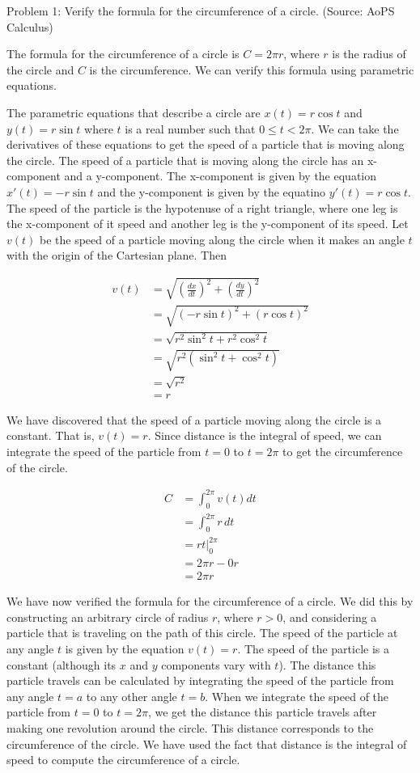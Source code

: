 Problem 1: Verify the formula for the circumference of a circle. (Source: AoPS Calculus)

The formula for the circumference of a circle is $C = 2\pi r$, where $r$ is the radius of the circle and $C$ is the circumference. We can verify this formula using parametric equations.

The parametric equations that describe a circle are $x(t) = r\cos t$ and $y(t) = r\sin t$ where $t$ is a real number such that $0 \leq t < 2 \pi$. We can take the derivatives of these equations to get the speed of a particle that is moving along the circle. The speed of a particle that is moving along the circle has an x-component and a y-component. The x-component is given by the equation $x'(t) = -r\sin t$ and the y-component is given by the equatino $y'(t) = r\cos t$. The speed of the particle is the hypotenuse of a right triangle, where one leg is the x-component of it speed and another leg is the y-component of its speed. Let $v(t)$ be the speed of a particle moving along the circle when it makes an angle $t$ with the origin of the Cartesian plane. Then

\begin{align*}
v(t) &= \sqrt{\left(\frac{dx}{dt}\right)^2 + \left(\frac{dy}{dt}\right)^2} \\
&= \sqrt{\left(-r\sin t\right)^2 + \left(r\cos t\right)^2} \\
&= \sqrt{r^2\sin^2 t + r^2 \cos^2 t} \\
&= \sqrt{r^2(\sin^2 t + \cos^2 t)} \\
&= \sqrt{r^2} \\
&= r
\end{align*}

We have discovered that the speed of a particle moving along the circle is a constant. That is, $v(t) = r$. Since distance is the integral of speed, we can integrate the speed of the particle from $t = 0$ to $t = 2\pi$ to get the circumference of the circle.

\begin{align*}
C &= \int_{0}^{2\pi} v(t) dt \\
&= \int_{0}^{2\pi} r \, dt \\
&= rt \Bigg|_{0}^{2\pi} \\
&= 2\pi r - 0r \\
&= \boxed{2\pi r}
\end{align*}

We have now verified the formula for the circumference of a circle. We did this by constructing an arbitrary circle of radius $r$, where $r > 0$, and considering a particle that is traveling on the path of this circle. The speed of the particle at any angle $t$ is given by the equation $v(t) = r$. The speed of the particle is a constant (although its $x$ and $y$ components vary with $t$). The distance this particle travels can be calculated by integrating the speed of the particle from any angle $t = a$ to any other angle $t = b$. When we integrate the speed of the particle from $t = 0$ to $t = 2\pi$, we get the distance this particle travels after making one revolution around the circle. This distance corresponds to the circumference of the circle. We have used the fact that distance is the integral of speed to compute the circumference of a circle.
